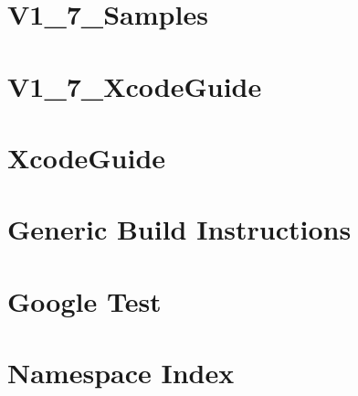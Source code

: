 \documentclass[twoside]{book}
\newcommand{\+}{\discretionary{\mbox{\scriptsize$\hookleftarrow$}}{}{}}
\begin{document}
\chapter{V1\+\_\+7\+\_\+\+Samples}
\label{md__home_bhargavi_Documents_SDR_Copy_Exam_808X_vendor_googletest_googletest_docs_V1_7_Samples}
\hypertarget{md__home_bhargavi_Documents_SDR_Copy_Exam_808X_vendor_googletest_googletest_docs_V1_7_Samples}{}

\chapter{V1\+\_\+7\+\_\+\+Xcode\+Guide}
\label{md__home_bhargavi_Documents_SDR_Copy_Exam_808X_vendor_googletest_googletest_docs_V1_7_XcodeGuide}
\hypertarget{md__home_bhargavi_Documents_SDR_Copy_Exam_808X_vendor_googletest_googletest_docs_V1_7_XcodeGuide}{}

\chapter{Xcode\+Guide}
\label{md__home_bhargavi_Documents_SDR_Copy_Exam_808X_vendor_googletest_googletest_docs_XcodeGuide}
\hypertarget{md__home_bhargavi_Documents_SDR_Copy_Exam_808X_vendor_googletest_googletest_docs_XcodeGuide}{}

\chapter{Generic Build Instructions}
\label{md__home_bhargavi_Documents_SDR_Copy_Exam_808X_vendor_googletest_googletest_README}
\hypertarget{md__home_bhargavi_Documents_SDR_Copy_Exam_808X_vendor_googletest_googletest_README}{}

\chapter{Google Test}
\label{md__home_bhargavi_Documents_SDR_Copy_Exam_808X_vendor_googletest_README}
\hypertarget{md__home_bhargavi_Documents_SDR_Copy_Exam_808X_vendor_googletest_README}{}

\chapter{Namespace Index}

\end{document}
